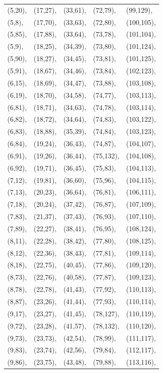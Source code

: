 \documentclass[twocolumn]{svjour3}
\begin{document}
\begin{center}
\begin{supertabular}[tb]{l l l l l}
(5,20),&(17,27),&(33,61),&(72,79),&(99,129),\\
(5,8),&(17,70),&(33,63),&(72,80),&(100,105),\\
(5,85),&(17,88),&(33,64),&(73,78),&(101,104),\\
(5,9),&(18,25),&(34,39),&(73,80),&(101,124),\\
(5,90),&(18,27),&(34,45),&(73,81),&(101,125),\\
(5,91),&(18,67),&(34,46),&(73,84),&(102,123),\\
(6,15),&(18,69),&(34,47),&(73,88),&(103,108),\\
(6,19),&(18,70),&(34,58),&(74,77),&(103,113),\\
(6,81),&(18,71),&(34,63),&(74,78),&(103,114),\\
(6,82),&(18,72),&(34,64),&(74,83),&(103,122),\\
(6,83),&(18,88),&(35,39),&(74,84),&(103,123),\\
(6,84),&(19,24),&(36,43),&(74,87),&(104,107),\\
(6,91),&(19,26),&(36,44),&(75,132),&(104,108),\\
(6,92),&(19,71),&(36,45),&(75,83),&(104,113),\\
(7,12),&(19,81),&(36,60),&(75,96),&(104,115),\\
(7,13),&(20,23),&(36,64),&(76,81),&(106,111),\\
(7,18),&(20,24),&(37,42),&(76,87),&(107,109),\\
(7,83),&(21,37),&(37,43),&(76,93),&(107,110),\\
(7,89),&(22,27),&(38,41),&(76,95),&(108,124),\\
(8,11),&(22,28),&(38,42),&(77,80),&(108,125),\\
(8,12),&(22,36),&(38,43),&(77,81),&(109,114),\\
(8,18),&(22,75),&(40,45),&(77,86),&(109,120),\\
(8,73),&(22,76),&(40,58),&(77,87),&(109,123),\\
(8,78),&(22,78),&(41,43),&(77,92),&(110,113),\\
(8,87),&(23,26),&(41,44),&(77,93),&(110,114),\\
(9,17),&(23,27),&(41,45),&(78,127),&(110,119),\\
(9,72),&(23,28),&(41,57),&(78,132),&(110,120),\\
(9,73),&(23,73),&(42,54),&(78,99),&(111,117),\\
(9,83),&(23,74),&(42,56),&(79,84),&(112,117),\\
(9,86),&(23,75),&(43,48),&(79,88),&(113,116),\\

\end{supertabular}
\end{center}
\end{document}
